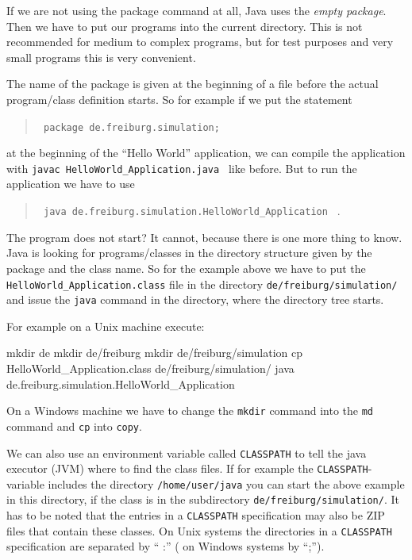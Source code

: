 If we are not using the package command at all, Java uses the \emph{empty 
package}. 
Then we have to put our programs into the current directory.
This is not recommended for medium to complex programs, but for
test purposes and very small programs this is very convenient.

The name of the package is given
at the beginning of a file before the actual program/class
definition starts. So for example if we put the statement
\begin{quotation}
  \verb/ package de.freiburg.simulation; / 
\end{quotation}
at the beginning of the ``Hello World'' application, we can compile
the application with \verb/javac HelloWorld_Application.java / like before.
But to run the application we have to use
\begin{quotation}
  \verb/ java de.freiburg.simulation.HelloWorld_Application / . 
\end{quotation}
The program does not start? It cannot, because
there is one more thing to know. Java is looking for programs/classes
in the directory structure given by the package and the class name. So
for the example above we have to put the 
\verb/HelloWorld_Application.class/ file
in the directory \verb|de/freiburg/simulation/| and issue the \verb|java|
command in the directory, where the directory tree starts.

For example on a Unix machine execute:
\begin{sverbatim}
 mkdir de
 mkdir de/freiburg
 mkdir de/freiburg/simulation
 cp HelloWorld_Application.class de/freiburg/simulation/
 java de.freiburg.simulation.HelloWorld_Application
\end{sverbatim}
On a Windows machine we have to change the \verb|mkdir| command into
the \verb|md| command and \verb|cp| into \verb|copy|.

We can also use an environment variable called \verb|CLASSPATH| to tell
the java executor (JVM) where to find the class files. 
If for example the
\verb|CLASSPATH|-variable includes the directory \verb|/home/user/java|
you can
start the above example in this directory, if the class is in the 
subdirectory  \verb|de/freiburg/simulation/|. It has to be noted that
the entries in a \verb|CLASSPATH| specification may also be ZIP files
that contain these classes. On Unix systems the directories in a
\verb|CLASSPATH| specification are separated by `` :'' ( on Windows systems
by ``;'').

